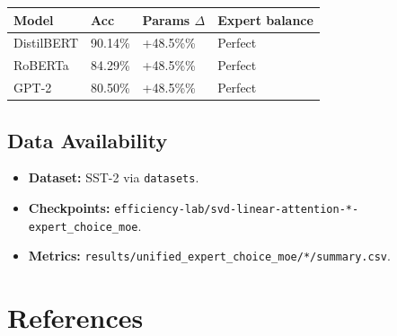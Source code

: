 \begin{table}[H]
\centering
\small
\begin{tabular}{llll}
\toprule
\textbf{Model} & \textbf{Acc} & \textbf{Params $\Delta$} & \textbf{Expert balance} \\
\midrule
DistilBERT & 90.14\% & +48.5\%\% & Perfect \\
RoBERTa & 84.29\% & +48.5\%\% & Perfect \\
GPT-2 & 80.50\% & +48.5\%\% & Perfect \\
\bottomrule
\end{tabular}
\end{table}

\subsection{Data Availability}

\begin{itemize}
\item \textbf{Dataset:} SST-2 via \texttt{datasets}.
\item \textbf{Checkpoints:} \texttt{efficiency-lab/svd-linear-attention-*-expert\_choice\_moe}.
\item \textbf{Metrics:} \texttt{results/unified\_expert\_choice\_moe/*/summary.csv}.

\end{itemize}


\section{References}

